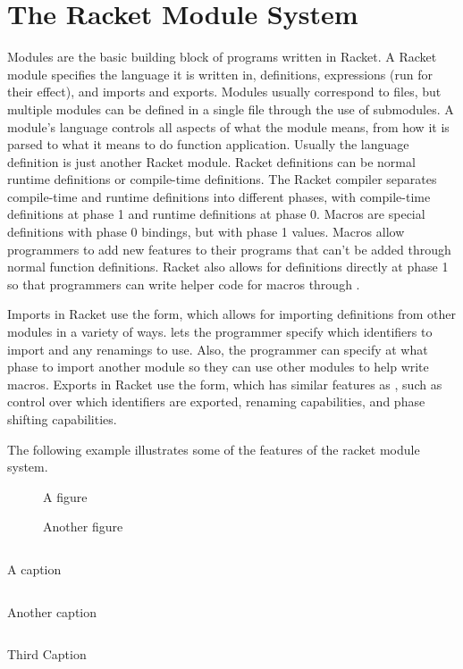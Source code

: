 \chapter{The Racket Module System}
Modules are the basic building block of programs written in Racket.
A Racket module specifies the language it is written in, definitions, expressions (run for their effect), and imports and exports. 
Modules usually correspond to files, but multiple modules can be defined in a single file through the use of submodules.
A module's language controls all aspects of what the module means, from how it is parsed to what it means to do function application. 
Usually the language definition is just another Racket module. 
Racket definitions can be normal runtime definitions or compile-time definitions.
The Racket compiler separates compile-time and runtime definitions into different phases, with compile-time definitions at phase 1 and runtime definitions at phase 0.
Macros are special definitions with phase 0 bindings, but with phase 1 values. 
Macros allow programmers to add new features to their programs that can't be added through normal function definitions. 
Racket also allows for definitions directly at phase 1 so that programmers can write helper code for macros through .

Imports in Racket use the  form, which allows for importing definitions from other modules in a variety of ways. 
 lets the programmer specify which identifiers to import and any renamings to use.
Also, the programmer can specify at what phase to import another module so they can use other modules to help write macros.
Exports in Racket use the  form, which has similar features as , such as control over which identifiers are exported, renaming capabilities, and phase shifting capabilities.

The following example illustrates some of the features of the racket module system. 
\begin{figure}
  \caption{A figure}
\end{figure}
\begin{figure}
  \caption{Another figure}
\end{figure}
\begin{listing}
  \inputminted{racket}{listings/obj.rkt}
  \caption{A caption}
  \label{lst:obj.rkt}
\end{listing}
\begin{listing}
  \inputminted{racket}{listings/while-test.rkt}
  \caption{Another caption}
  \label{lst:while-test.rkt}
\end{listing}
\begin{listing}
  \inputminted{racket}{listings/while-lang.rkt}
  \caption{Third Caption}
  \label{lst:while-lang.rkt}
\end{listing}

